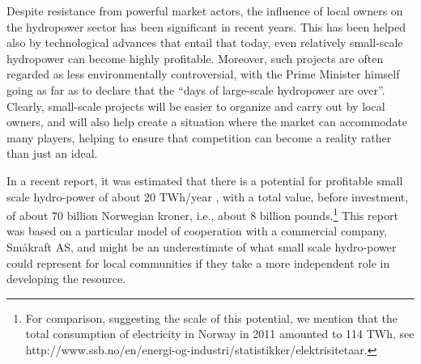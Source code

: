 
Despite resistance from powerful market actors, the influence of local owners on the hydropower sector has been significant in recent years. This has been helped also by technological advances that entail that today, even relatively  small-scale hydropower can become highly profitable. Moreover, such projects are often regarded as less environmentally controversial, with the Prime Minister himself going as far as to declare that the ``days of large-scale hydropower are over''.  Clearly, small-scale projects will be easier to organize and carry out by local owners, and will also help create a situation where the market can accommodate many players, helping to ensure that competition can become a reality rather than just an ideal. 

In a recent report, it was estimated that there is a potential for profitable small scale hydro-power of about 20 TWh/year \cite{Aanesland}, with a total value, before investment, of about 70 billion Norwegian kroner, i.e., about 8 billion pounds.\footnote{For comparison, suggesting the scale of this potential, we mention that the total consumption of electricity in Norway in 2011 amounted to 114 TWh, see http://www.ssb.no/en/energi-og-industri/statistikker/elektrisitetaar.}  This report was based on a particular model of cooperation with a commercial company, Småkraft AS, and might be an underestimate of what small scale hydro-power could represent for local communities if they take a more independent role in developing the resource. 

